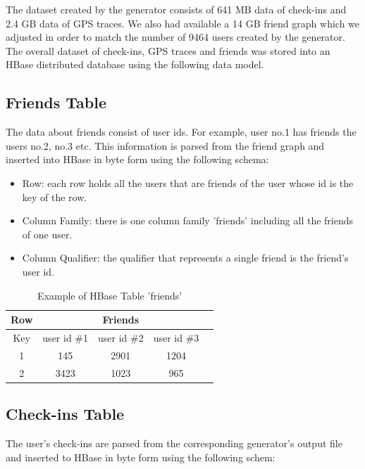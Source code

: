 The dataset created by the generator consists of 641 MB data of check-ins and 2.4 GB data of GPS traces. We also had available a 14 GB friend graph which 
we adjusted in order to match the number of 9464 users created by the generator. The overall dataset of check-ins, GPS traces and friends was stored 
into an HBase distributed database using the following data model.

\subsection{Friends Table}

The data about friends consist of user ids. For example, user no.1 has friends the users no.2, no.3 etc. This information is parsed from the friend graph and 
inserted into HBase in byte form using the following schema:

\begin{itemize}
 \item Row: each row holds all the users that are friends of the user whose id is the key of the row.
 \item Column Family: there is one column family 'friends' including all the friends of one user.
 \item Column Qualifier: the qualifier that represents a single friend is the friend's user id.
\end{itemize}

\begin{table}[H]
\begin{center}
\begin{tabular}{|c|c|c|c|c|}
 \hline
 Row & \multicolumn{3}{|c|}{Friends} \\
 \hline
 Key & user id \#1 & user id \#2 & user id \#3 \\
 \hline
 1 & 145 & 2901 & 1204 \\ \hline 
 2 & 3423 & 1023 & 965 \\
 \hline
\end{tabular}
\end{center}
\caption{Example of HBase Table 'friends'}
\end{table}

\subsection{Check-ins Table}

The user's check-ins are parsed from the corresponding generator's output file and inserted to HBase in byte form using the following schem:

